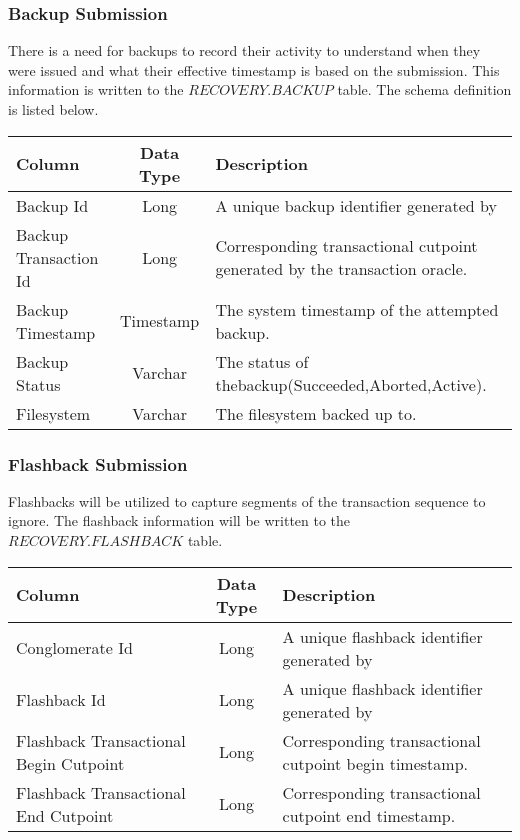 \subsubsection{Backup Submission}

There is a need for backups to record their activity to understand when they
were issued and what their effective timestamp is based on the submission.  This
information is written to the ${RECOVERY.BACKUP}$ table.  The schema definition
is listed below.
 
\begin{center}
\begin{tabular}{|l|c|p{5cm}|}
				\hline
				\bf{Column}							&	\bf{Data Type}	&	\bf{Description} \\ \hline
				Backup Id							&	Long			&	A unique backup identifier generated by \\ \hline 
				Backup Transaction Id				& 	Long			& 	Corresponding
				transactional cutpoint generated by the transaction oracle. \\ \hline 
				Backup Timestamp				   &	Timestamp		&	The system timestamp of
				the attempted backup.
				\\
				\hline 
				Backup Status						&	Varchar			& 	The status of
				thebackup(Succeeded,Aborted,Active).
				\\
				\hline
				Filesystem						&	Varchar			& 	The filesystem backed up to.
				\\
				\hline
\end{tabular}
\end{center}

\subsubsection{Flashback Submission}

Flashbacks will be utilized to capture segments of the
transaction sequence to ignore.  The flashback information will be written to
the ${RECOVERY.FLASHBACK}$ table.

\begin{center}
\begin{tabular}{|l|c|p{5cm}|}
				\hline
				\bf{Column}							&	\bf{Data Type}	&	\bf{Description} \\ \hline
				\hline 
				Conglomerate Id							&	Long			&	A unique flashback identifier generated by
				\\
				\hline 
				Flashback Id							&	Long			&	A unique flashback identifier generated by \\
				\hline 
				Flashback Transactional Begin Cutpoint		& 	Long			& 	Corresponding
				transactional cutpoint begin timestamp. \\
				\hline Flashback Transactional End Cutpoint		&	Long			&	Corresponding
				transactional cutpoint end timestamp.
				\\
				\hline 				
\end{tabular}
\end{center}

